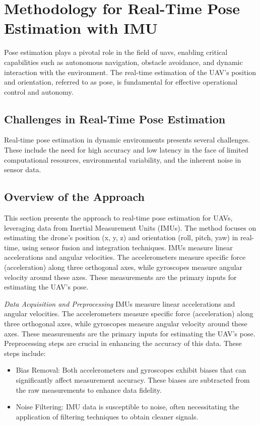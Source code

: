\section{Methodology for Real-Time Pose Estimation with IMU}

Pose estimation plays a pivotal role in the field of \acrshort{uavs}, enabling critical capabilities such as autonomous navigation, obstacle avoidance, and dynamic interaction with the environment. The real-time estimation of the UAV's position and orientation, referred to as pose, is fundamental for effective operational control and autonomy.

\subsection{Challenges in Real-Time Pose Estimation} 
Real-time pose estimation in dynamic environments presents several challenges. These include the need for high accuracy and low latency in the face of limited computational resources, environmental variability, and the inherent noise in sensor data.

\subsection{Overview of the Approach} 
This section presents the approach to real-time pose estimation for UAVs, leveraging data from Inertial Measurement Units (IMUs). The method focuses on estimating the drone's position (x, y, z) and orientation (roll, pitch, yaw) in real-time, using sensor fusion and integration techniques. IMUs measure linear accelerations and angular velocities. The accelerometers measure specific force (acceleration) along three orthogonal axes, while gyroscopes measure angular velocity around these axes. These measurements are the primary inputs for estimating the UAV's pose.

\textit{Data Acquisition and Preprocessing} IMUs measure linear accelerations and angular velocities. The accelerometers measure specific force (acceleration) along three orthogonal axes, while gyroscopes measure angular velocity around these axes. These measurements are the primary inputs for estimating the UAV's pose. Preprocessing steps are crucial in enhancing the accuracy of this data. These steps include:
\begin{itemize}
    \item Bias Removal: Both accelerometers and gyroscopes exhibit biases that can significantly affect measurement accuracy. These biases are subtracted from the raw measurements to enhance data fidelity.
    \item Noise Filtering: IMU data is susceptible to noise, often necessitating the application of filtering techniques to obtain cleaner signals.
\end{itemize}


